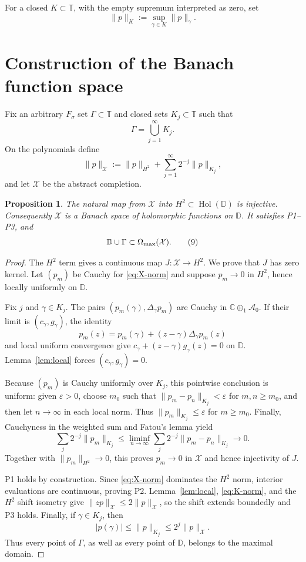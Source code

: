 \documentclass[11pt]{article}
\newtheorem{proposition}[theorem]{Proposition}
\newcommand{\D}{\mathbb D}
\newcommand{\T}{\mathbb T}
\newcommand{\C}{\mathbb C}
\newcommand{\X}{\mathcal X}
\newcommand{\A}{\mathcal A_0}
\newcommand{\Om}{\Omega_{\rm max}}
\begin{document}
For a closed $K\subset\T$, with the empty supremum interpreted as zero,
set
\[
 \|p\|_K:=\sup_{\gamma\in K}\|p\|_\gamma.
 \tag{6}\label{eq:K-norm}
\]

\section{Construction of the Banach function space}

Fix an arbitrary $F_\sigma$ set $\Gamma\subset\T$ and closed sets
$K_j\subset\T$ such that
\[
 \Gamma=\bigcup_{j=1}^{\infty}K_j.
 \tag{7}\label{eq:Gamma-layers}
\]
On the polynomials define
\[
 \|p\|_{\X}
 :=\|p\|_{H^2}+\sum_{j=1}^{\infty}2^{-j}\|p\|_{K_j},
 \tag{8}\label{eq:X-norm}
\]
and let $\X$ be the abstract completion.

\begin{proposition}\label{prop:functionspace}
The natural map from $\X$ into $H^2\subset\operatorname{Hol}(\D)$ is
injective.  Consequently $\X$ is a Banach space of holomorphic functions on
$\D$.  It satisfies P1--P3, and
\[
 \D\cup\Gamma\subset\Om(\X).
 \tag{9}\label{eq:easy-inclusion}
\]
\end{proposition}

\begin{proof}
The $H^2$ term gives a continuous map $J:\X\to H^2$.  We prove that
$J$ has zero kernel.  Let $(p_m)$ be Cauchy for \eqref{eq:X-norm} and suppose
$p_m\to0$ in $H^2$, hence locally uniformly on $\D$.

Fix $j$ and $\gamma\in K_j$.  The pairs
$(p_m(\gamma),\Delta_\gamma p_m)$ are Cauchy in $\C\oplus_1\A$.  If their
limit is $(c_\gamma,g_\gamma)$, the identity
\[
 p_m(z)=p_m(\gamma)+(z-\gamma)\Delta_\gamma p_m(z)
\]
and local uniform convergence give
$c_\gamma+(z-\gamma)g_\gamma(z)=0$ on $\D$.  Lemma~\ref{lem:local} forces
$(c_\gamma,g_\gamma)=0$.

Because $(p_m)$ is Cauchy uniformly over $K_j$, this pointwise conclusion is
uniform: given $\varepsilon>0$, choose $m_0$ such that
$\|p_m-p_n\|_{K_j}<\varepsilon$ for $m,n\ge m_0$, and then let $n\to\infty$
in each local norm.  Thus $\|p_m\|_{K_j}\le\varepsilon$ for $m\ge m_0$.
Finally, Cauchyness in the weighted sum and Fatou's lemma yield
\[
 \sum_j2^{-j}\|p_m\|_{K_j}
 \le \liminf_{n\to\infty}
 \sum_j2^{-j}\|p_m-p_n\|_{K_j}\longrightarrow0.
\]
Together with $\|p_m\|_{H^2}\to0$, this proves $p_m\to0$ in $\X$ and hence
injectivity of $J$.

P1 holds by construction.  Since \eqref{eq:X-norm} dominates the $H^2$ norm,
interior evaluations are continuous, proving P2.  Lemma~\ref{lem:local},
\eqref{eq:K-norm}, and the $H^2$ shift isometry give
$\|zp\|_{\X}\le2\|p\|_{\X}$, so the shift extends boundedly and P3 holds.
Finally, if $\gamma\in K_j$, then
\[
 |p(\gamma)|\le\|p\|_{K_j}\le2^j\|p\|_{\X}.
\]
Thus every point of $\Gamma$, as well as every point of $\D$, belongs to the
maximal domain.
\end{proof}
\end{document}
